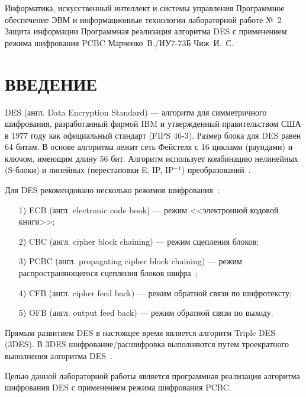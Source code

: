\documentclass{bmstu}
\begin{document}
\makereporttitle
    {Информатика, искусственный интеллект и системы управления} %
    {Программное обеспечение ЭВМ и информационные технологии} %
    {лабораторной работе №~2} %
    {Защита информации} %
    {Программная реализация алгоритма DES с применением режима шифрования PCBC} %
    {} %
    {Марченко~В./ИУ7-73Б} %
    {Чиж~И.~С.} %

{\centering \maketableofcontents}

{\centering \chapter*{ВВЕДЕНИЕ}}

DES (англ. Data Encryption Standard) --- алгоритм для симметричного шифрования, разработанный фирмой IBM и утвержденный правительством США в 1977 году как официальный стандарт (FIPS 46-3). 
Размер блока для DES равен 64 битам. 
В основе алгоритма лежит сеть Фейстеля с 16 циклами (раундами) и ключом, имеющим длину 56 бит. 
Алгоритм использует комбинацию нелинейных (S-блоки) и линейных (перестановки E, IP, IP$^{-1}$) преобразований~\cite{wiki-des}.

Для DES рекомендовано несколько режимов шифрования~\cite{wiki-des}:
\begin{enumerate}
\item[1)] ECB (англ. electronic code book) --- режим <<электронной кодовой книги>>;
\item[2)] CBC (англ. cipher block chaining) --- режим сцепления блоков;
\item[3)] PCBC (англ. propagating cipher block chaining) --- режим распространяющегося сцепления блоков шифра~\cite{wiki-pcbc};
\item[4)] CFB (англ. cipher feed back) --- режим обратной связи по шифротексту;
\item[5)] OFB (англ. output feed back) --- режим обратной связи по выходу.
\end{enumerate}

Прямым развитием DES в настоящее время является алгоритм Triple DES (3DES). 
В 3DES шифрование/расшифровка выполняются путем троекратного выполнения алгоритма DES~\cite{wiki-des}.

Целью данной лабораторной работы является программная реализация алгоритма шифрования DES с применением режима шифрования PCBC.
\end{document}
